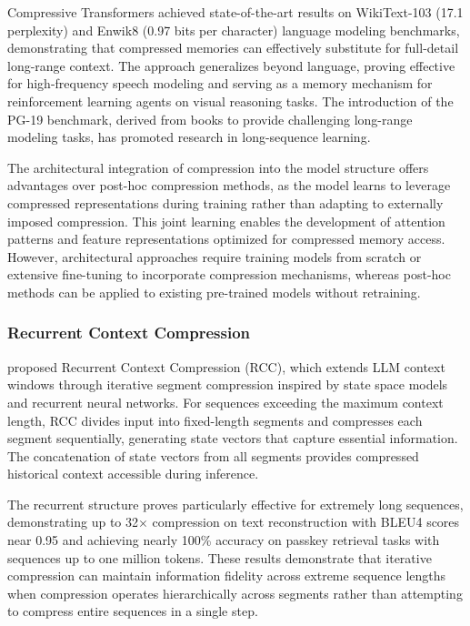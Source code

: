 \documentclass[11pt,letterpaper]{article}
\begin{document}
Compressive Transformers achieved state-of-the-art results on WikiText-103 (17.1 perplexity) and Enwik8 (0.97 bits per character) language modeling benchmarks, demonstrating that compressed memories can effectively substitute for full-detail long-range context. The approach generalizes beyond language, proving effective for high-frequency speech modeling and serving as a memory mechanism for reinforcement learning agents on visual reasoning tasks. The introduction of the PG-19 benchmark, derived from books to provide challenging long-range modeling tasks, has promoted research in long-sequence learning.

The architectural integration of compression into the model structure offers advantages over post-hoc compression methods, as the model learns to leverage compressed representations during training rather than adapting to externally imposed compression. This joint learning enables the development of attention patterns and feature representations optimized for compressed memory access. However, architectural approaches require training models from scratch or extensive fine-tuning to incorporate compression mechanisms, whereas post-hoc methods can be applied to existing pre-trained models without retraining.

\subsubsection{Recurrent Context Compression}

\cite{ge2024recurrent} proposed Recurrent Context Compression (RCC), which extends LLM context windows through iterative segment compression inspired by state space models and recurrent neural networks. For sequences exceeding the maximum context length, RCC divides input into fixed-length segments and compresses each segment sequentially, generating state vectors that capture essential information. The concatenation of state vectors from all segments provides compressed historical context accessible during inference.

The recurrent structure proves particularly effective for extremely long sequences, demonstrating up to 32$\times$ compression on text reconstruction with BLEU4 scores near 0.95 and achieving nearly 100\% accuracy on passkey retrieval tasks with sequences up to one million tokens. These results demonstrate that iterative compression can maintain information fidelity across extreme sequence lengths when compression operates hierarchically across segments rather than attempting to compress entire sequences in a single step.
\end{document}
